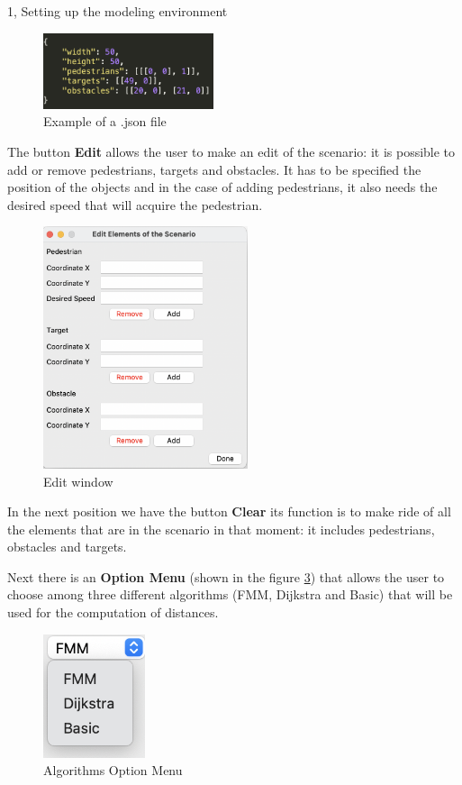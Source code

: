 \documentclass[10pt,a4paper]{article}
\begin{document}
\begin{task}{1, Setting up the modeling environment}
\begin{figure}[h]
    \includegraphics[width=5cm]{json}
    \centering
    \caption{Example of a .json file}
    \label{fig3}
\end{figure}

\hfill \break 

The button \textbf{Edit} allows the user to make an edit of the scenario: it is possible to add or remove pedestrians, targets and obstacles. It has to be specified the position of the objects and in the case of adding pedestrians, it also needs the desired speed that will acquire the pedestrian.

\begin{figure}[h]
    \includegraphics[width=6cm]{edit}
    \centering
    \caption{Edit window}
    \label{fig4}
\end{figure}

In the next position we have the button \textbf{Clear} its function is to make ride of all the elements that are in the scenario in that moment: it includes pedestrians, obstacles and targets.

Next there is an \textbf{Option Menu} (shown in the figure \ref{fig5}) that allows the user to choose among three different algorithms (FMM, Dijkstra and Basic) that will be used for the computation of distances.  

\begin{figure}[h]
    \includegraphics[width=3cm]{option menu}
    \centering
    \caption{Algorithms Option Menu}
    \label{fig5}
\end{figure}


\end{task}
\end{document}
